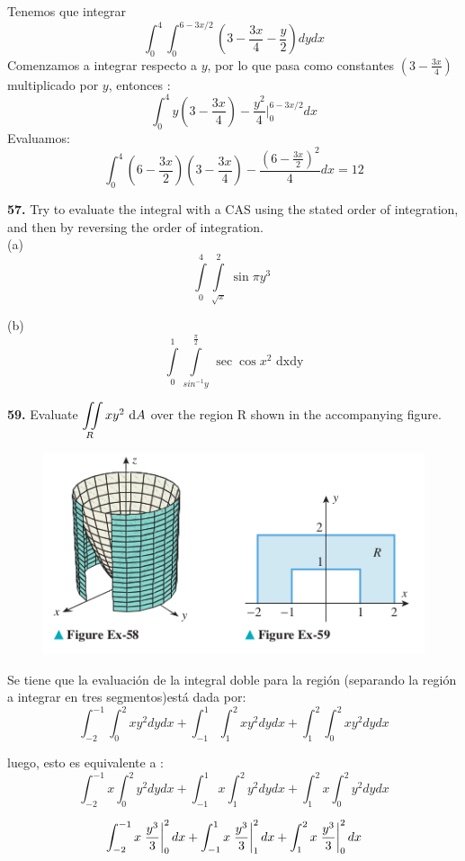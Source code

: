 \documentclass[11pt]{report}
\begin{document}
Tenemos que integrar
\[\int_0^4 \int_0^{6-3x/2}\left( 3- \frac{3x}{4}- \frac{y}{2} \right) dy dx\]
Comenzamos a integrar respecto a $y$, por lo que pasa como constantes $(3- \frac{3x}{4})$ multiplicado por $y$, entonces :
\[\int_0^4 y \left( 3- \frac{3x}{4}\right)- \frac{y^2}{4} \vert_0^{6-3x/2} dx\]
Evaluamos:
\[\int_0^4 \left(6 - \frac{3x}{2} \right)\left( 3- \frac{3x}{4}\right)- \frac{\left(6 - \frac{3x}{2} \right)^2}{4} dx = 12\]

\textbf{57.} Try to evaluate the integral with a CAS using the stated order of
integration, and then by reversing the order of integration.\\

(a) \[\displaystyle \int \limits_0^4 \int \limits_{\sqrt{x}}^2 \, \sin{\pi y^3} \, \,  \]

(b) \[\displaystyle \int \limits_0^1 \int \limits_{sin^{-1}y}^{\frac{\pi}{2}}  \, \sec{\cos{x}}^2 \, \, \text{dx} \text{dy} \]

\textbf{59.} Evaluate $ {\displaystyle \iint \limits_R } \, xy^2 \, \, \text dA $ over
the region R shown in the accompanying figure. \\
\begin{figure}[h]
\includegraphics[scale=0.5]{img2.png}
\centering
\end{figure}

Se tiene que la evaluación de la integral doble para la región (separando la
región a integrar en tres segmentos)está dada por:
	$$ \int_{-2}^{-1}\int_{0}^{2} xy^2 dydx +
	   \int_{-1}^{1}\int_{1}^{2} xy^2 dydx +
	   \int_{1}^{2}\int_{0}^{2} xy^2 dydx $$

luego, esto es equivalente a :
	$$ \int_{-2}^{-1} x \int_{0}^{2} y^2 dydx +
		\int_{-1}^{1} x \int_{1}^{2} y^2 dydx +
		\int_{1}^{2} x \int_{0}^{2} y^2 dydx $$

	$$ \int_{-2}^{-1} x \left.\frac{y^3}{3}\right\rvert_{0}^{2} dx +
		\int_{-1}^{1} x \left.\frac{y^3}{3}\right\rvert_{1}^{2} dx +
		\int_{1}^{2} x \left.\frac{y^3}{3}\right\rvert_{0}^{2} dx $$
\end{document}
